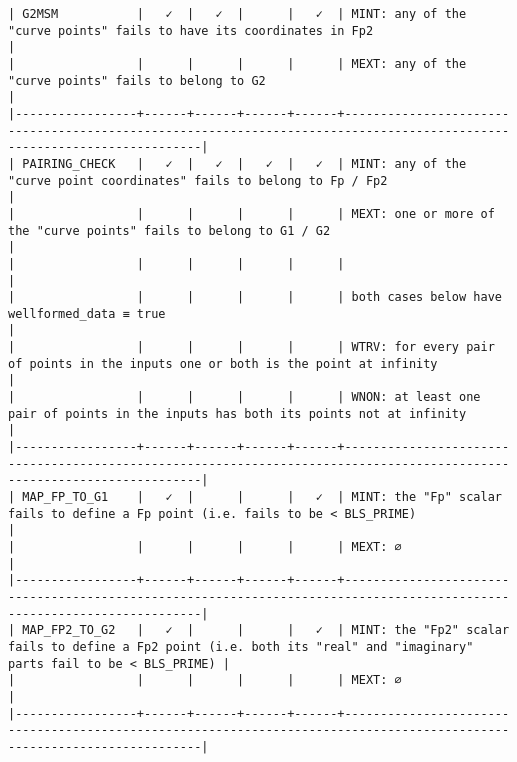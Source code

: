 \documentclass[varwidth=\maxdimen,margin=0.5cm,multi={verbatim}]{standalone}
\begin{document}
\begin{verbatim}
| G2MSM           |   ✓  |   ✓  |      |   ✓  | MINT: any of the "curve points" fails to have its coordinates in Fp2                                                   |
|                 |      |      |      |      | MEXT: any of the "curve points" fails to belong to G2                                                                  |
|-----------------+------+------+------+------+------------------------------------------------------------------------------------------------------------------------|
| PAIRING_CHECK   |   ✓  |   ✓  |   ✓  |   ✓  | MINT: any of the "curve point coordinates" fails to belong to Fp / Fp2                                                 |
|                 |      |      |      |      | MEXT: one or more of the "curve points" fails to belong to G1 / G2                                                     |
|                 |      |      |      |      |                                                                                                                        |
|                 |      |      |      |      | both cases below have wellformed_data ≡ true                                                                           |
|                 |      |      |      |      | WTRV: for every pair of points in the inputs one or both is the point at infinity                                      |
|                 |      |      |      |      | WNON: at least one pair of points in the inputs has both its points not at infinity                                    |
|-----------------+------+------+------+------+------------------------------------------------------------------------------------------------------------------------|
| MAP_FP_TO_G1    |   ✓  |      |      |   ✓  | MINT: the "Fp" scalar fails to define a Fp point (i.e. fails to be < BLS_PRIME)                                        |
|                 |      |      |      |      | MEXT: ∅                                                                                                                |
|-----------------+------+------+------+------+------------------------------------------------------------------------------------------------------------------------|
| MAP_FP2_TO_G2   |   ✓  |      |      |   ✓  | MINT: the "Fp2" scalar fails to define a Fp2 point (i.e. both its "real" and "imaginary" parts fail to be < BLS_PRIME) |
|                 |      |      |      |      | MEXT: ∅                                                                                                                |
|-----------------+------+------+------+------+------------------------------------------------------------------------------------------------------------------------|


\end{verbatim}
\end{document}
